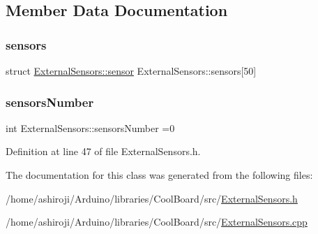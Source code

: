 \subsection{Member Data Documentation}
\mbox{\label{class_external_sensors_a284233f884fcf00154a44740cf1d9e1e}} 
\subsubsection{\texorpdfstring{sensors}{sensors}}
{\footnotesize\ttfamily struct \hyperlink{struct_external_sensors_1_1sensor}{External\+Sensors\+::sensor} External\+Sensors\+::sensors\mbox{[}50\mbox{]}\hspace{0.3cm}{\ttfamily [private]}}

\mbox{\label{class_external_sensors_a58e4fbf9adeae787d92be5fa33043b5d}} 
\subsubsection{\texorpdfstring{sensors\+Number}{sensorsNumber}}
{\footnotesize\ttfamily int External\+Sensors\+::sensors\+Number =0\hspace{0.3cm}{\ttfamily [private]}}



Definition at line 47 of file External\+Sensors.\+h.



The documentation for this class was generated from the following files\+:\begin{DoxyCompactItemize}
\item 
/home/ashiroji/\+Arduino/libraries/\+Cool\+Board/src/\hyperlink{_external_sensors_8h}{External\+Sensors.\+h}\item 
/home/ashiroji/\+Arduino/libraries/\+Cool\+Board/src/\hyperlink{_external_sensors_8cpp}{External\+Sensors.\+cpp}\end{DoxyCompactItemize}

